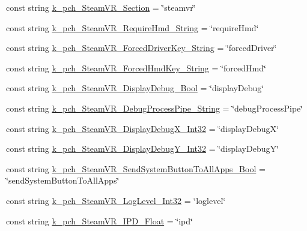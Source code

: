\begin{DoxyCompactItemize}
\item 
const string \mbox{\hyperlink{class_valve_1_1_v_r_1_1_open_v_r_a44d63338521bf74f67033ae966730652}{k\+\_\+pch\+\_\+\+Steam\+V\+R\+\_\+\+Section}} = \char`\"{}steamvr\char`\"{}
\item 
const string \mbox{\hyperlink{class_valve_1_1_v_r_1_1_open_v_r_acf9f92058ec4f4e7ed2003b34e10d949}{k\+\_\+pch\+\_\+\+Steam\+V\+R\+\_\+\+Require\+Hmd\+\_\+\+String}} = \char`\"{}require\+Hmd\char`\"{}
\item 
const string \mbox{\hyperlink{class_valve_1_1_v_r_1_1_open_v_r_a93fa912235a451dcba75cf971c9613b8}{k\+\_\+pch\+\_\+\+Steam\+V\+R\+\_\+\+Forced\+Driver\+Key\+\_\+\+String}} = \char`\"{}forced\+Driver\char`\"{}
\item 
const string \mbox{\hyperlink{class_valve_1_1_v_r_1_1_open_v_r_abb9986dc518656df112214eb5f81538b}{k\+\_\+pch\+\_\+\+Steam\+V\+R\+\_\+\+Forced\+Hmd\+Key\+\_\+\+String}} = \char`\"{}forced\+Hmd\char`\"{}
\item 
const string \mbox{\hyperlink{class_valve_1_1_v_r_1_1_open_v_r_a6046a93699c9fcdada51fed050f9e73d}{k\+\_\+pch\+\_\+\+Steam\+V\+R\+\_\+\+Display\+Debug\+\_\+\+Bool}} = \char`\"{}display\+Debug\char`\"{}
\item 
const string \mbox{\hyperlink{class_valve_1_1_v_r_1_1_open_v_r_a9aaba2873b54a18983221c3afd394b30}{k\+\_\+pch\+\_\+\+Steam\+V\+R\+\_\+\+Debug\+Process\+Pipe\+\_\+\+String}} = \char`\"{}debug\+Process\+Pipe\char`\"{}
\item 
const string \mbox{\hyperlink{class_valve_1_1_v_r_1_1_open_v_r_aaa5f03d2720215b18999f271bb30d535}{k\+\_\+pch\+\_\+\+Steam\+V\+R\+\_\+\+Display\+Debug\+X\+\_\+\+Int32}} = \char`\"{}display\+DebugX\char`\"{}
\item 
const string \mbox{\hyperlink{class_valve_1_1_v_r_1_1_open_v_r_ade4db0fdec5a4ed56088e48b1a431f91}{k\+\_\+pch\+\_\+\+Steam\+V\+R\+\_\+\+Display\+Debug\+Y\+\_\+\+Int32}} = \char`\"{}display\+DebugY\char`\"{}
\item 
const string \mbox{\hyperlink{class_valve_1_1_v_r_1_1_open_v_r_a250e70a54346e4c23df6163e4bda19e0}{k\+\_\+pch\+\_\+\+Steam\+V\+R\+\_\+\+Send\+System\+Button\+To\+All\+Apps\+\_\+\+Bool}} = \char`\"{}send\+System\+Button\+To\+All\+Apps\char`\"{}
\item 
const string \mbox{\hyperlink{class_valve_1_1_v_r_1_1_open_v_r_a29d293e836c6c27bf7ee4564525d8a01}{k\+\_\+pch\+\_\+\+Steam\+V\+R\+\_\+\+Log\+Level\+\_\+\+Int32}} = \char`\"{}loglevel\char`\"{}
\item 
const string \mbox{\hyperlink{class_valve_1_1_v_r_1_1_open_v_r_aa0236d47ce9030dcc393a40897a0fb65}{k\+\_\+pch\+\_\+\+Steam\+V\+R\+\_\+\+I\+P\+D\+\_\+\+Float}} = \char`\"{}ipd\char`\"{}

\end{DoxyCompactItemize}

